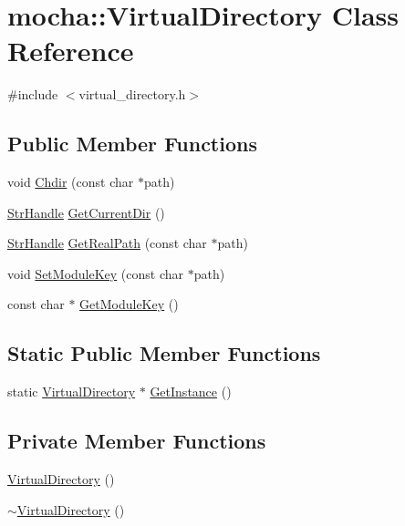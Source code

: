 \hypertarget{classmocha_1_1_virtual_directory}{
\section{mocha::VirtualDirectory Class Reference}
\label{classmocha_1_1_virtual_directory}
}


{\ttfamily \#include $<$virtual\_\-directory.h$>$}

\subsection*{Public Member Functions}
\begin{DoxyCompactItemize}
\item 
void \hyperlink{classmocha_1_1_virtual_directory_a3fcebad22c5bc3aecf988c1d43757e7f}{Chdir} (const char $\ast$path)
\item 
\hyperlink{classmocha_1_1_array_handle}{StrHandle} \hyperlink{classmocha_1_1_virtual_directory_a64b87cf340fb47de69270a810b8c0061}{GetCurrentDir} ()
\item 
\hyperlink{classmocha_1_1_array_handle}{StrHandle} \hyperlink{classmocha_1_1_virtual_directory_a7c47ab997a30264921ba91f8d37c8ace}{GetRealPath} (const char $\ast$path)
\item 
void \hyperlink{classmocha_1_1_virtual_directory_a0a0931a13c9695d7fd7c1c76c9cd9e64}{SetModuleKey} (const char $\ast$path)
\item 
const char $\ast$ \hyperlink{classmocha_1_1_virtual_directory_a820d2419c20916d9e60bbe8df3e4ce0e}{GetModuleKey} ()
\end{DoxyCompactItemize}
\subsection*{Static Public Member Functions}
\begin{DoxyCompactItemize}
\item 
static \hyperlink{classmocha_1_1_virtual_directory}{VirtualDirectory} $\ast$ \hyperlink{classmocha_1_1_virtual_directory_a6e494f3f1789c66f16221c66caec5cb2}{GetInstance} ()
\end{DoxyCompactItemize}
\subsection*{Private Member Functions}
\begin{DoxyCompactItemize}
\item 
\hyperlink{classmocha_1_1_virtual_directory_a96d507bbf4dd7de023bb21e80dc5d5d5}{VirtualDirectory} ()
\item 
\hyperlink{classmocha_1_1_virtual_directory_a1f3e6231a62b83a4bea8bd1c4a028ea8}{$\sim$VirtualDirectory} ()
\end{DoxyCompactItemize}
